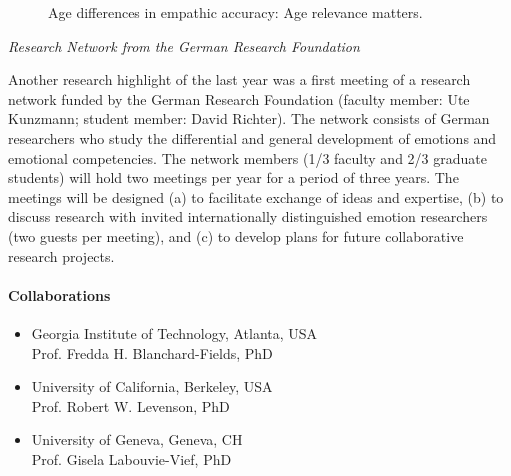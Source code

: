 \begin{figure}[htb]
  \begin{center}
    \caption{Age differences in empathic accuracy: Age relevance matters.}
    \label{fig1:profUteKunzmann}
  \end{center}
\end{figure}



\textit{Research Network from the German Research Foundation}

 Another research highlight of the last year was a first meeting of a research network funded by the German Research Foundation (faculty member: Ute Kunzmann; student member: David Richter). The network consists of German researchers who study the differential and general development of emotions and emotional competencies. The network members (1/3 faculty and 2/3 graduate students) will hold two meetings per year for a period of three years. The meetings will be designed (a) to facilitate exchange of ideas and expertise, (b) to discuss research with invited internationally distinguished emotion researchers (two guests per meeting), and (c) to develop plans for future collaborative research projects.

\paragraph{Collaborations}
\begin{itemize}
\item Georgia Institute of Technology, Atlanta, USA \\ Prof. Fredda H. Blanchard-Fields, PhD
\item University of California, Berkeley, USA \\ Prof. Robert W. Levenson, PhD
\item University of Geneva, Geneva, CH \\ Prof. Gisela Labouvie-Vief, PhD
\end{itemize}

